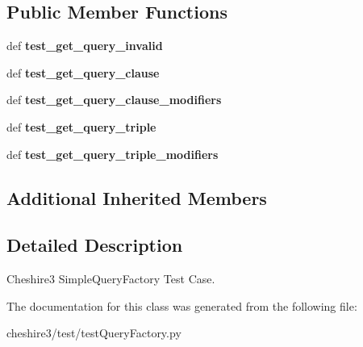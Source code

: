 \subsection*{Public Member Functions}
\begin{DoxyCompactItemize}
\item 
\hypertarget{classcheshire3_1_1test_1_1test_query_factory_1_1_simple_query_factory_test_case_a95c0e5fe19be5223316d97b2eac7fd0e}{def {\bfseries test\-\_\-get\-\_\-query\-\_\-invalid}}\label{classcheshire3_1_1test_1_1test_query_factory_1_1_simple_query_factory_test_case_a95c0e5fe19be5223316d97b2eac7fd0e}

\item 
\hypertarget{classcheshire3_1_1test_1_1test_query_factory_1_1_simple_query_factory_test_case_a30be8ca1009bdefbcffc7b686ef77d69}{def {\bfseries test\-\_\-get\-\_\-query\-\_\-clause}}\label{classcheshire3_1_1test_1_1test_query_factory_1_1_simple_query_factory_test_case_a30be8ca1009bdefbcffc7b686ef77d69}

\item 
\hypertarget{classcheshire3_1_1test_1_1test_query_factory_1_1_simple_query_factory_test_case_a69b3ec64957c657d527fc385b0c0c64d}{def {\bfseries test\-\_\-get\-\_\-query\-\_\-clause\-\_\-modifiers}}\label{classcheshire3_1_1test_1_1test_query_factory_1_1_simple_query_factory_test_case_a69b3ec64957c657d527fc385b0c0c64d}

\item 
\hypertarget{classcheshire3_1_1test_1_1test_query_factory_1_1_simple_query_factory_test_case_aea9c7033c3ceffdfade083abd176ad47}{def {\bfseries test\-\_\-get\-\_\-query\-\_\-triple}}\label{classcheshire3_1_1test_1_1test_query_factory_1_1_simple_query_factory_test_case_aea9c7033c3ceffdfade083abd176ad47}

\item 
\hypertarget{classcheshire3_1_1test_1_1test_query_factory_1_1_simple_query_factory_test_case_a543e9d2fd8e5c6c1952b2ad69b610674}{def {\bfseries test\-\_\-get\-\_\-query\-\_\-triple\-\_\-modifiers}}\label{classcheshire3_1_1test_1_1test_query_factory_1_1_simple_query_factory_test_case_a543e9d2fd8e5c6c1952b2ad69b610674}

\end{DoxyCompactItemize}
\subsection*{Additional Inherited Members}


\subsection{Detailed Description}
\begin{DoxyVerb}Cheshire3 SimpleQueryFactory Test Case.\end{DoxyVerb}
 

The documentation for this class was generated from the following file\-:\begin{DoxyCompactItemize}
\item 
cheshire3/test/test\-Query\-Factory.\-py\end{DoxyCompactItemize}
